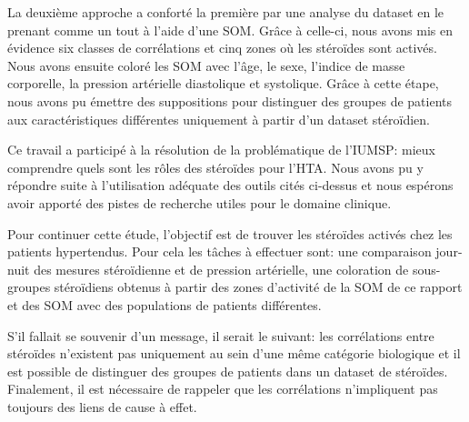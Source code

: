 La deuxième approche a conforté la première par une analyse du dataset en le prenant comme un tout à l'aide d'une SOM. Grâce à celle-ci, nous avons mis en évidence six classes de corrélations et cinq zones où les stéroïdes sont activés. Nous avons ensuite coloré les SOM avec l'âge, le sexe, l'indice de masse corporelle, la pression artérielle diastolique et systolique. Grâce à cette étape, nous avons pu émettre des suppositions pour distinguer des groupes de patients aux caractéristiques différentes uniquement à partir d'un dataset stéroïdien.

Ce travail a participé à la résolution de la problématique de l'IUMSP: mieux comprendre quels sont les rôles des stéroïdes pour l'HTA. Nous avons pu y répondre suite à l'utilisation adéquate des outils cités ci-dessus et nous espérons avoir apporté des pistes de recherche utiles pour le domaine clinique. 

Pour continuer cette étude, l'objectif est de trouver les stéroïdes activés chez les patients hypertendus. Pour cela les tâches à effectuer sont: une comparaison jour-nuit des mesures stéroïdienne et de pression artérielle, une coloration de sous-groupes stéroïdiens obtenus à partir des zones d'activité de la SOM de ce rapport et des SOM avec des populations de patients différentes.

S'il fallait se souvenir d'un message, il serait le suivant: les corrélations entre stéroïdes n'existent pas uniquement au sein d'une même catégorie biologique et il est possible de distinguer des groupes de patients dans un dataset de stéroïdes. Finalement, il est nécessaire de rappeler que les corrélations n'impliquent pas toujours des liens de cause à effet.



